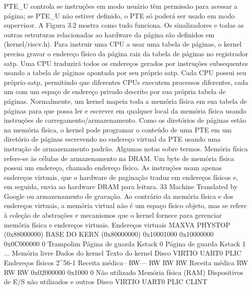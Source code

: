  PTE_U  controla  se  instruções  em  modo  usuário  têm  permissão  para  acessar  a  página;  se  PTE_U  não  estiver  definido,  
o  PTE  só  poderá  ser  usado  em  modo  supervisor.  A  Figura  3.2  mostra  como  tudo  funciona.  Os  sinalizadores  e  todas  as  
outras  estruturas  relacionadas  ao  hardware  da  página  são  definidos  em  (kernel/riscv.h).
 Para  instruir  uma  CPU  a  usar  uma  tabela  de  páginas,  o  kernel  precisa  gravar  o  endereço  físico  da  página  raiz  da  
tabela  de  páginas  no  registrador  satp.  Uma  CPU  traduzirá  todos  os  endereços  gerados  por  instruções  subsequentes  
usando  a  tabela  de  páginas  apontada  por  seu  próprio  satp.  Cada  CPU  possui  seu  próprio  satp,  permitindo  que  
diferentes  CPUs  executem  processos  diferentes,  cada  um  com  um  espaço  de  endereço  privado  descrito  por  sua  
própria  tabela  de  páginas.
 Normalmente,  um  kernel  mapeia  toda  a  memória  física  em  sua  tabela  de  páginas  para  que  possa  ler  e  escrever  
em  qualquer  local  da  memória  física  usando  instruções  de  carregamento/armazenamento.  Como  os  diretórios  de  
páginas  estão  na  memória  física,  o  kernel  pode  programar  o  conteúdo  de  uma  PTE  em  um  diretório  de  páginas  
escrevendo  no  endereço  virtual  da  PTE  usando  uma  instrução  de  armazenamento  padrão.
 Algumas  notas  sobre  termos.  Memória  física  refere-se  às  células  de  armazenamento  na  DRAM.  Um  byte  de  
memória  física  possui  um  endereço,  chamado  endereço  físico.  As  instruções  usam  apenas  endereços  virtuais,  que  o  
hardware  de  paginação  traduz  em  endereços  físicos  e,  em  seguida,  envia  ao  hardware  DRAM  para  leitura.
 33
Machine Translated by Google
 ou  armazenamento  de  gravação.  Ao  contrário  da  memória  física  e  dos  endereços  virtuais,  a  memória  virtual  não  é  um  espaço  físico
 objeto,  mas  se  refere  à  coleção  de  abstrações  e  mecanismos  que  o  kernel  fornece  para  gerenciar
 memória  física  e  endereços  virtuais.
 Endereços  virtuais
 MAXVA
 PHYSTOP  
(0x88000000)
 BASE  DO  
KERN  (0x80000000)
 0x10001000
 0x10000000
 0x0C000000
 0
 Trampolim
 Página  de  guarda
 Kstack  0
 Página  de  guarda
 Kstack  1
 ...
 Memória  livre
 Dados  do  kernel
 Texto  do  kernel
 Disco  VIRTIO
 UART0
 PLIC
 Endereços  físicos
 2^56-1
 Receita  médica--
RW---
RW
RW
RW
Receita  médica
 RW
RW
RW
0x02000000
 0x1000
 0
 Não  utilizado
 Memória  física  (RAM)
 Dispositivos  
de  E/S  não  utilizados  e  outros
 Disco  VIRTIO
 UART0
 PLIC
 CLINT
